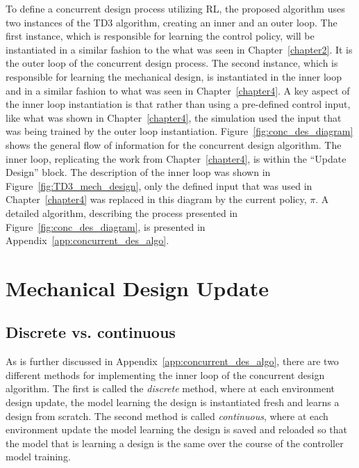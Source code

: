 To define a concurrent design process utilizing RL, the proposed algorithm uses two instances of the TD3 algorithm, creating an inner and an outer loop. The first instance, which is responsible for learning the control policy, will be instantiated in a similar fashion to the what was seen in Chapter~\ref{chapter2}. It is the outer loop of the concurrent design process. The second instance, which is responsible for learning the mechanical design, is instantiated in the inner loop and in a similar fashion to what was seen in Chapter~\ref{chapter4}. A key aspect of the inner loop instantiation is that rather than using a pre-defined control input, like what was shown in Chapter~\ref{chapter4}, the simulation used the input that was being trained by the outer loop instantiation. Figure~\ref{fig:conc_des_diagram} shows the general flow of information for the concurrent design algorithm. The inner loop, replicating the work from Chapter~\ref{chapter4}, is within the ``Update Design'' block. The description of the inner loop was shown in Figure~\ref{fig:TD3_mech_design}, only the defined input that was used in Chapter~\ref{chapter4} was replaced in this diagram by the current policy, $\pi$. A detailed algorithm, describing the process presented in Figure~\ref{fig:conc_des_diagram}, is presented in Appendix~\ref{app:concurrent_des_algo}. 

\section{Mechanical Design Update}
\subsection{Discrete vs. continuous}
As is further discussed in Appendix~\ref{app:concurrent_des_algo}, there are two different methods for implementing the inner loop of the concurrent design algorithm. The first is called the \textit{discrete} method, where at each environment design update, the model learning the design is instantiated fresh and learns a design from scratch. The second method is called \textit{continuous}, where at each environment update the model learning the design is saved and reloaded so that the model that is learning a design is the same over the course of the controller model training. 

